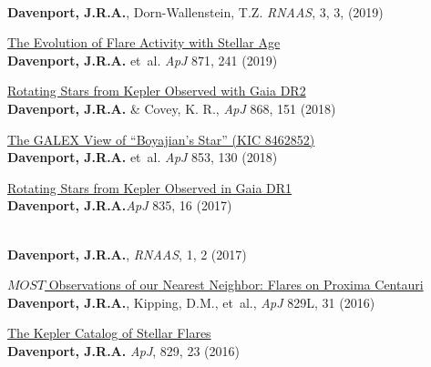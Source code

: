 \documentclass{article}
\begin{document}
\begin{llist}
\begin{etaremune}[leftmargin=10pt]
\item{}\\
{\bf Davenport, J.R.A.}, Dorn-Wallenstein, T.Z. {\em RNAAS}, 3, 3, (2019)


\item{\sc \href{https://arxiv.org/abs/1901.00890}{\color{NavyBlue}The Evolution of Flare Activity with Stellar Age}}\\
{\bf Davenport, J.R.A.} et~al.  {\em ApJ} 871, 241 (2019)

\item{\sc \href{https://arxiv.org/abs/1807.09841}{\color{NavyBlue} Rotating Stars from Kepler Observed with Gaia DR2}}\\
{\bf Davenport, J.R.A.} \& Covey, K. R., {\em ApJ} 868, 151 (2018)


\item{\sc \href{https://arxiv.org/abs/1712.04948}{\color{NavyBlue}The GALEX View of ``Boyajian's Star'' (KIC 8462852)}}\\
{\bf Davenport, J.R.A.} et~al. {\em ApJ} 853, 130 (2018)


\item{\sc \href{https://arxiv.org/abs/1610.08563}{\color{NavyBlue} Rotating Stars from Kepler Observed in Gaia DR1}}\\
{\bf Davenport, J.R.A.}{\em ApJ} 835, 16 (2017)

\item{\href{http://adsabs.harvard.edu/abs/2017arXiv171009468D}{\color{NavyBlue}{\sc Infrared Flares from M Dwarfs: a Hinderance to Future Transiting Exoplanet Studies}}}\\
{\bf Davenport, J.R.A.}, {\em RNAAS}, 1, 2 (2017)


\item{\sc \href{http://arxiv.org/abs/1608.06672}{\color{NavyBlue} $MOST$ Observations of our Nearest Neighbor: Flares on Proxima Centauri}}\\
{\bf Davenport, J.R.A.}, Kipping, D.M., et~al., {\em ApJ} 829L, 31 (2016)

\item{\sc \href{http://adsabs.harvard.edu/abs/2016ApJ...829...23D}{\color{NavyBlue}The Kepler Catalog of Stellar Flares}}\\
{\bf Davenport, J.R.A.} {\em ApJ}, 829, 23 (2016)


\end{etaremune}
\end{llist}
\end{document}
